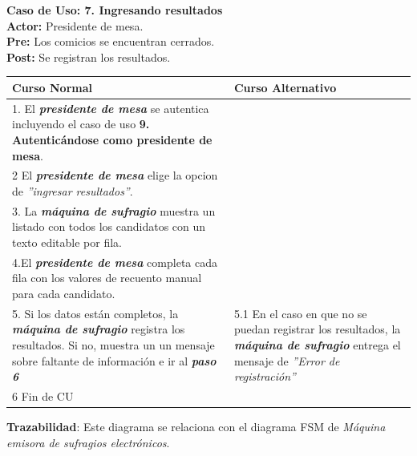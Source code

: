 \documentclass[spanish, 10pt,a4paper]{article}
\numberwithin{equation}{section} %
\begin{document}
\clearpage
\noindent\textbf{Caso de Uso: 7. Ingresando resultados}\\
\textbf{Actor: } Presidente de mesa.\\
\textbf{Pre: } Los comicios se encuentran cerrados.\\
\textbf{Post: } Se registran los resultados.\\
\begin{table}[H]
  \centering
\bgroup
\def\arraystretch{1.3}
  \begin{tabular}{p{9cm} | p{7cm}}
    \hline
    Curso Normal & Curso Alternativo \\
    \hline
    \hline    
    1. El \textbf{\textit{presidente de mesa}} se autentica incluyendo el caso de uso \textbf{ 9. Autenticándose como presidente de mesa}. 
    & \\
   
    \hline
    2 El \textbf{\textit{presidente de mesa}} elige la opcion de \textit{''ingresar resultados''}.
    & \\
    
    \hline
    3. La \textbf{\textit{máquina de sufragio}} muestra un listado con todos los candidatos con un texto editable por fila.
    \\
    
  \hline
    4.El \textbf{\textit{presidente de mesa}} completa cada fila con los valores de recuento manual para cada candidato.
    \\
	
    \hline
    5. Si los datos están completos, la \textbf{\textit{máquina de sufragio}} registra los resultados. Si no, muestra un un mensaje sobre faltante de información e ir al \textbf{\textit{paso 6}}
    &
    5.1 En el caso en que no se puedan registrar los resultados, la \textbf{\textit{máquina de sufragio}} entrega el mensaje de \textit{''Error de registración''}
    \\
    
    \hline
    6 Fin de CU
    & \\
    \hline
  \end{tabular}
\egroup
\end{table}
\vspace{-10px}
\noindent\textbf{Trazabilidad}: Este diagrama se relaciona con el diagrama FSM de \textit{Máquina emisora de sufragios electrónicos}.\\
\end{document}
